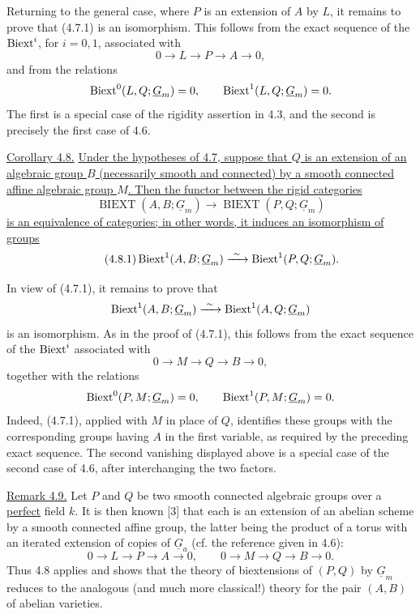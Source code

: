 Returning to the general case, where $P$ is an extension of $A$ by
$L$, it remains to prove that (4.7.1) is an isomorphism.  This follows
from the exact sequence of the $\operatorname{Biext}^i$, for $i=0,1$, associated
with
\[
 0\longrightarrow L\longrightarrow P\longrightarrow A
 \longrightarrow0,
\]
and from the relations
\[
 \Biext^0(L,Q;\underline G_m)=0,
 \qquad
 \Biext^1(L,Q;\underline G_m)=0.
\]
The first is a special case of the rigidity assertion in 4.3, and
the second is precisely the first case of 4.6.

\medskip
\noindent\underline{Corollary 4.8.}  \underline{Under the hypotheses
of 4.7, suppose that $Q$ is an extension of an algebraic group $B$
(necessarily smooth and connected) by a smooth connected affine
algebraic group $M$.  Then the functor between the rigid categories}
\[
 \operatorname{BIEXT}(A,B;\underline G_m)
 \longrightarrow
 \operatorname{BIEXT}(P,Q;\underline G_m)
\]
\underline{is an equivalence of categories; in other words, it
induces an isomorphism of groups}
\begin{equation}\tag{4.8.1}
 \Biext^1(A,B;\underline G_m)
 \xrightarrow{\ \sim\ }
 \Biext^1(P,Q;\underline G_m).
\end{equation}

In view of (4.7.1), it remains to prove that
\[
 \Biext^1(A,B;\underline G_m)
 \xrightarrow{\ \sim\ }
 \Biext^1(A,Q;\underline G_m)
\]
is an isomorphism.  As in the proof of (4.7.1), this follows from the
exact sequence of the $\operatorname{Biext}^i$ associated with
\[
 0\longrightarrow M\longrightarrow Q\longrightarrow B
 \longrightarrow0,
\]
together with the relations
\[
 \Biext^0(P,M;\underline G_m)=0,
 \qquad
 \Biext^1(P,M;\underline G_m)=0.
\]
Indeed, (4.7.1), applied with $M$ in place of $Q$, identifies these
groups with the corresponding groups having $A$ in the first
variable, as required by the preceding exact sequence.  The second
vanishing displayed above is a special case of the second case of
4.6, after interchanging the two factors.

\medskip
\noindent\underline{Remark 4.9.}  Let $P$ and $Q$ be two smooth
connected algebraic groups over a \underline{perfect} field $k$.
It is then known [3] that each is an extension of an abelian scheme
by a smooth connected affine group, the latter being the product of
a torus with an iterated extension of copies of $\underline G_a$
(cf. the reference given in 4.6):
\[
 0\longrightarrow L\longrightarrow P\longrightarrow A
 \longrightarrow0,
 \qquad
 0\longrightarrow M\longrightarrow Q\longrightarrow B
 \longrightarrow0.
\]
Thus 4.8 applies and shows that the theory of biextensions of $(P,Q)$
by $\underline G_m$ reduces to the analogous (and much more
classical!) theory for the pair $(A,B)$ of abelian varieties.

